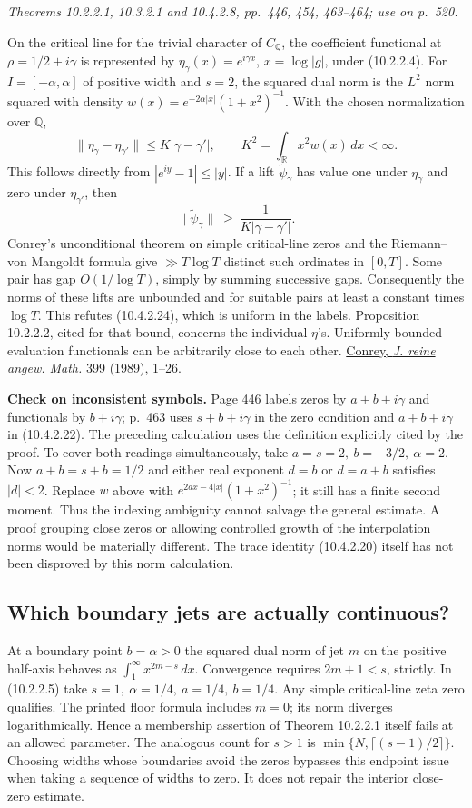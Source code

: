 \documentclass[11pt,reqno]{amsart}
\numberwithin{equation}{section}
\newcommand{\Q}{\mathbb Q}\newcommand{\R}{\mathbb R}\newcommand{\C}{\mathbb C}\newcommand{\Z}{\mathbb Z}
\begin{document}
\textit{Theorems 10.2.2.1, 10.3.2.1 and 10.4.2.8, pp.~446, 454, 463--464; use on p.~520.}\par
On the critical line for the trivial character of \(C_\Q\), the coefficient functional at \(\rho=1/2+i\gamma\) is represented by \(\eta_\gamma(x)=e^{i\gamma x}\), \(x=\log |g|\), under (10.2.2.4). For \(I=[-\alpha,\alpha]\) of positive width and \(s=2\), the squared dual norm is the \(L^2\) norm squared with density \(w(x)=e^{-2\alpha|x|}(1+x^2)^{-1}\). With the chosen normalization over \(\Q\),
\[
 \|\eta_\gamma-\eta_{\gamma'}\|\le K|\gamma-\gamma'|,
 \qquad K^2=\int_\R x^2w(x)\,dx<\infty.
\]
This follows directly from \(|e^{iy}-1|\le |y|\). If a lift \(\widetilde\psi_\gamma\) has value one under \(\eta_\gamma\) and zero under \(\eta_{\gamma'}\), then
\[
       \|\widetilde\psi_\gamma\|\ \ge\ \frac{1}{K|\gamma-\gamma'|}.
\]
Conrey's unconditional theorem on simple critical-line zeros and the Riemann--von Mangoldt formula give \(\gg T\log T\) distinct such ordinates in \([0,T]\). Some pair has gap \(O(1/\log T)\), simply by summing successive gaps. Consequently the norms of these lifts are unbounded and for suitable pairs at least a constant times \(\log T\). This refutes (10.4.2.24), which is uniform in the labels. Proposition 10.2.2.2, cited for that bound, concerns the individual \(\eta\)'s. Uniformly bounded evaluation functionals can be arbitrarily close to each other. \href{https://doi.org/10.1515/crll.1989.399.1}{Conrey, \textit{J. reine angew. Math.} 399 (1989), 1--26.}

\textbf{Check on inconsistent symbols.} Page 446 labels zeros by \(a+b+i\gamma\) and functionals by \(b+i\gamma\); p.~463 uses \(s+b+i\gamma\) in the zero condition and \(a+b+i\gamma\) in (10.4.2.22). The preceding calculation uses the definition explicitly cited by the proof. To cover both readings simultaneously, take \(a=s=2,\ b=-3/2,\ \alpha=2\). Now \(a+b=s+b=1/2\) and either real exponent \(d=b\) or \(d=a+b\) satisfies \(|d|<2\). Replace \(w\) above with \(e^{2dx-4|x|}(1+x^2)^{-1}\); it still has a finite second moment. Thus the indexing ambiguity cannot salvage the general estimate. A proof grouping close zeros or allowing controlled growth of the interpolation norms would be materially different. The trace identity (10.4.2.20) itself has not been disproved by this norm calculation.

\subsection*{Which boundary jets are actually continuous?}
At a boundary point \(b=\alpha>0\) the squared dual norm of jet \(m\) on the positive half-axis behaves as \(\int_1^\infty x^{2m-s}\,dx\). Convergence requires \(2m+1<s\), strictly. In (10.2.2.5) take \(s=1,\ \alpha=1/4,\ a=1/4,\ b=1/4\). Any simple critical-line zeta zero qualifies. The printed floor formula includes \(m=0\); its norm diverges logarithmically. Hence a membership assertion of Theorem 10.2.2.1 itself fails at an allowed parameter. The analogous count for \(s>1\) is \(\min\{N,\lceil(s-1)/2\rceil\}\). Choosing widths whose boundaries avoid the zeros bypasses this endpoint issue when taking a sequence of widths to zero. It does not repair the interior close-zero estimate.
\end{document}
